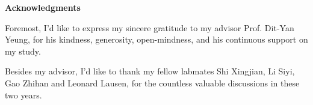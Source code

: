 \centerline{{\bf \Large Acknowledgments}} \vspace{5mm} \noindent

Foremost, I'd like to express my sincere gratitude to my advisor Prof. Dit-Yan Yeung, for his kindness, generosity, open-mindness, and his continuous support on my study.

Besides my advisor, I'd like to thank my fellow labmates Shi Xingjian, Li Siyi, Gao Zhihan and Leonard Lausen, for the countless valuable discussions in these two years.

